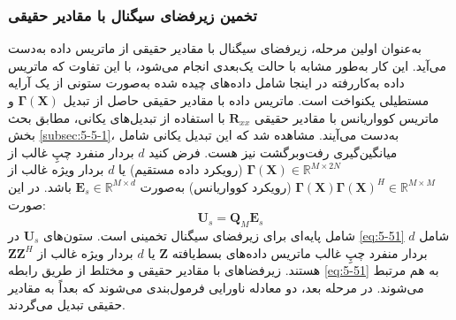 \subsubsection{تخمین زیرفضای سیگنال با مقادیر حقیقی}
\label{subsubsec:5-5-2-1}
به‌عنوان اولین مرحله، زیرفضای سیگنال با مقادیر حقیقی از ماتریس داده به‌دست می‌آید. این کار به‌طور مشابه با حالت  یک‌بعدی انجام می‌شود، با این تفاوت که ماتریس داده به‌کاررفته در اینجا شامل داده‌های چیده شده به‌صورت ستونی از یک آرایه مستطیلی یکنواخت است. ماتریس داده با مقادیر حقیقی حاصل از تبدیل $\bm{\Gamma}(\bm{X})$ و ماتریس کوواریانس با مقادیر حقیقی $\bm{R}_{xx}$ با استفاده از تبدیل‌های یکانی، مطابق بحث بخش \ref{subsec:5-5-1}، به‌دست می‌آیند. مشاهده شد که این تبدیل یکانی شامل میانگین‌گیری رفت‌وبرگشت نیز هست. فرض کنید $d$ بردار منفرد چپِ غالب از $\bm{\Gamma}(\bm{X}) \in \mathbb{R}^{M \times 2N}$ (رویکرد داده مستقیم) یا $d$ بردار ویژه غالب از $\bm{\Gamma}(\bm{X})\bm{\Gamma}(\bm{X})^H \in \mathbb{R}^{M \times M}$ (رویکرد کوواریانس) به‌صورت $\bm{E}_s \in \mathbb{R}^{M \times d}$ باشد. در این صورت:
\begin{equation}
	\bm{U}_s = \bm{Q}_M \bm{E}_s
	\label{eq:5-51}
\end{equation}
شامل پایه‌ای برای زیرفضای سیگنال تخمینی است. ستون‌های $\bm{U}_s$ در \eqref{eq:5-51} شامل $d$ بردار منفرد چپِ غالب ماتریس داده‌های بسط‌یافته $\bm{Z}$ یا $d$ بردار ویژه غالب از $\bm{ZZ}^H$ هستند. زیرفضاهای با مقادیر حقیقی و مختلط از طریق رابطه \eqref{eq:5-51} به هم مرتبط می‌شوند. در مرحله بعد، دو معادله ناورایی فرمول‌بندی می‌شوند که بعداً به مقادیر حقیقی تبدیل می‌گردند.











